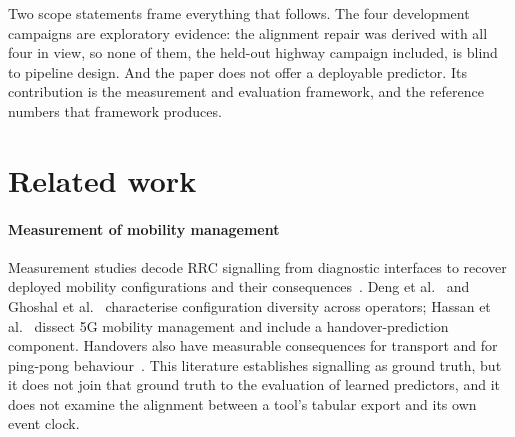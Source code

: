 \documentclass[5p,times,twocolumn]{elsarticle}
\begin{document}
Two scope statements frame everything that follows. The four development campaigns are exploratory evidence: the alignment repair was derived with all four in view, so none of them, the held-out highway campaign included, is blind to pipeline design. And the paper does not offer a deployable predictor. Its contribution is the measurement and evaluation framework, and the reference numbers that framework produces.

\section{Related work}
\label{sec:related}

\paragraph{Measurement of mobility management} Measurement studies decode RRC signalling from diagnostic interfaces to recover deployed mobility configurations and their consequences~\cite{ref3,ref4,ref5,ref41}. Deng et al.~\cite{ref3} and Ghoshal et al.~\cite{ref4} characterise configuration diversity across operators; Hassan et al.~\cite{ref5} dissect 5G mobility management and include a handover-prediction component. Handovers also have measurable consequences for transport and for ping-pong behaviour~\cite{ref6,ref14}. This literature establishes signalling as ground truth, but it does not join that ground truth to the evaluation of learned predictors, and it does not examine the alignment between a tool's tabular export and its own event clock.
\end{document}
